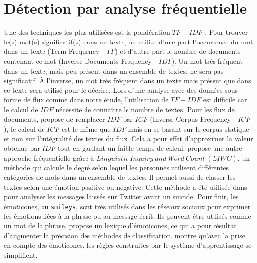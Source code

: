 \documentclass[utf8]{stageM2R} %
\theoremstyle{remark}
\begin{document}
\section{Détection par analyse fréquentielle}
Une des techniques les plus utilisées est la pondération $TF-IDF$ \cite{Salton1988}. Pour trouver le(s) mot(s) significatif(s) dans un texte, on utilise d'une part l'occurrence du mot dans un texte (Term Frequency - $TF$) et d'autre part le nombre de documents  contenant ce mot  (Inverse Documents Frequency - $IDF$). Un mot très fréquent dans un texte, mais peu présent dans un ensemble de textes, ne sera pas significatif. À l'inverse, un mot très fréquent dans un texte mais présent que dans ce texte sera utilisé pour le décrire.
Lors d'une analyse avec des données sous forme de flux comme dans notre étude, l'utilisation de $TF-IDF$ est difficile car le calcul de $IDF$ nécessite de connaître le nombre de textes. Pour les flux de documents, \cite{Reed2006} propose de remplacer $IDF$ par $ICF$  (Inverse Corpus Frequency - $ICF$), le calcul de $ICF$ est le même que $IDF$ mais en se basant sur le corpus statique et non sur l'intégralité des textes du flux. Cela a pour effet d'approximer la valeur obtenue par $IDF$ tout en gardant un faible temps de calcul.
\cite{Pennebaker2001} propose une autre approche fréquentielle grâce à $Linguistic~Inquiry~and~Word~Count~(LIWC)$, un méthode qui calcule le degré selon lequel les personnes utilisent différentes catégories de mots dans un ensemble de textes. Il permet aussi de classer les textes selon une émotion positive ou négative. Cette méthode a été utilisée dans \cite{Gunn2012} pour analyser les messages laissés sur Twitter avant un suicide.
Pour finir, les émoticones, ou \texttt{smileys}, sont très utilisés dans les réseaux sociaux pour exprimer les émotions liées à la phrase ou au message écrit. Ils peuvent être utilisés comme  un mot de la phrase. \cite{Hogenboom2013} propose un lexique d'émoticones, ce qui a pour résultat d'augmenter la précision des méthodes de classification. \cite{Read2005} montre qu'avec la prise en compte des émoticones, les règles construites par le système d'apprentissage se simplifient.
\end{document}
